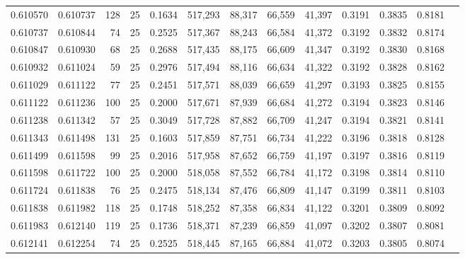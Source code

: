 \begin{tabular}{rrrrrrrrrrrrr}
0.610570 & 0.610737 &   128 &  25 &                                     0.1634 & 517,293 &  88,317 &  66,559 &  41,397 & 0.3191 & 0.3835 & 0.8181 \\
0.610737 & 0.610844 &    74 &  25 &                                     0.2525 & 517,367 &  88,243 &  66,584 &  41,372 & 0.3192 & 0.3832 & 0.8174 \\
0.610847 & 0.610930 &    68 &  25 &                                     0.2688 & 517,435 &  88,175 &  66,609 &  41,347 & 0.3192 & 0.3830 & 0.8168 \\
0.610932 & 0.611024 &    59 &  25 &                                     0.2976 & 517,494 &  88,116 &  66,634 &  41,322 & 0.3192 & 0.3828 & 0.8162 \\
0.611029 & 0.611122 &    77 &  25 &                                     0.2451 & 517,571 &  88,039 &  66,659 &  41,297 & 0.3193 & 0.3825 & 0.8155 \\
0.611122 & 0.611236 &   100 &  25 &                                     0.2000 & 517,671 &  87,939 &  66,684 &  41,272 & 0.3194 & 0.3823 & 0.8146 \\
0.611238 & 0.611342 &    57 &  25 &                                     0.3049 & 517,728 &  87,882 &  66,709 &  41,247 & 0.3194 & 0.3821 & 0.8141 \\
0.611343 & 0.611498 &   131 &  25 &                                     0.1603 & 517,859 &  87,751 &  66,734 &  41,222 & 0.3196 & 0.3818 & 0.8128 \\
0.611499 & 0.611598 &    99 &  25 &                                     0.2016 & 517,958 &  87,652 &  66,759 &  41,197 & 0.3197 & 0.3816 & 0.8119 \\
0.611598 & 0.611722 &   100 &  25 &                                     0.2000 & 518,058 &  87,552 &  66,784 &  41,172 & 0.3198 & 0.3814 & 0.8110 \\
0.611724 & 0.611838 &    76 &  25 &                                     0.2475 & 518,134 &  87,476 &  66,809 &  41,147 & 0.3199 & 0.3811 & 0.8103 \\
0.611838 & 0.611982 &   118 &  25 &                                     0.1748 & 518,252 &  87,358 &  66,834 &  41,122 & 0.3201 & 0.3809 & 0.8092 \\
0.611983 & 0.612140 &   119 &  25 &                                     0.1736 & 518,371 &  87,239 &  66,859 &  41,097 & 0.3202 & 0.3807 & 0.8081 \\
0.612141 & 0.612254 &    74 &  25 &                                     0.2525 & 518,445 &  87,165 &  66,884 &  41,072 & 0.3203 & 0.3805 & 0.8074 \\

\end{tabular}

